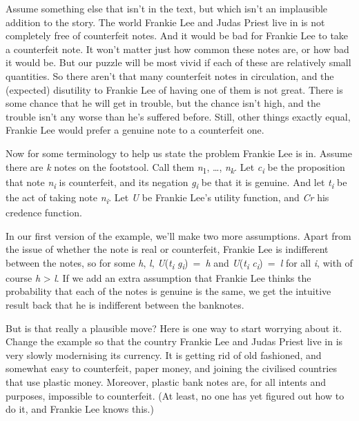 \documentclass[
  10pt,
  letterpaper,
  DIV=11,
  numbers=noendperiod,
  twoside]{scrartcl}
\begin{document}
Assume something else that isn't in the text, but which isn't an
implausible addition to the story. The world Frankie Lee and Judas
Priest live in is not completely free of counterfeit notes. And it would
be bad for Frankie Lee to take a counterfeit note. It won't matter just
how common these notes are, or how bad it would be. But our puzzle will
be most vivid if each of these are relatively small quantities. So there
aren't that many counterfeit notes in circulation, and the (expected)
disutility to Frankie Lee of having one of them is not great. There is
some chance that he will get in trouble, but the chance isn't high, and
the trouble isn't any worse than he's suffered before. Still, other
things exactly equal, Frankie Lee would prefer a genuine note to a
counterfeit one.

Now for some terminology to help us state the problem Frankie Lee is in.
Assume there are \emph{k} notes on the footstool. Call them
\emph{n}\textsubscript{1}, \ldots, \emph{n\textsubscript{k}}. Let
\emph{c\textsubscript{i}} be the proposition that note
\emph{n\textsubscript{i}} is counterfeit, and its negation
\emph{g\textsubscript{i}} be that it is genuine. And let
\emph{t\textsubscript{i}} be the act of taking note
\emph{n\textsubscript{i}}. Let \emph{U} be Frankie Lee's utility
function, and \emph{Cr} his credence function.

In our first version of the example, we'll make two more assumptions.
Apart from the issue of whether the note is real or counterfeit, Frankie
Lee is indifferent between the notes, so for some \emph{h}, \emph{l},
\emph{U}(\emph{t\textsubscript{i}} \textbar{}
\emph{g\textsubscript{i}})~=~\emph{h} and
\emph{U}(\emph{t\textsubscript{i}} \textbar{}
\emph{c\textsubscript{i}})~=~\emph{l} for all \emph{i}, with of course
\emph{h} \textgreater{} \emph{l}. If we add an extra assumption that
Frankie Lee thinks the probability that each of the notes is genuine is
the same, we get the intuitive result back that he is indifferent
between the banknotes.

But is that really a plausible move? Here is one way to start worrying
about it. Change the example so that the country Frankie Lee and Judas
Priest live in is very slowly modernising its currency. It is getting
rid of old fashioned, and somewhat easy to counterfeit, paper money, and
joining the civilised countries that use plastic money. Moreover,
plastic bank notes are, for all intents and purposes, impossible to
counterfeit. (At least, no one has yet figured out how to do it, and
Frankie Lee knows this.)
\end{document}
